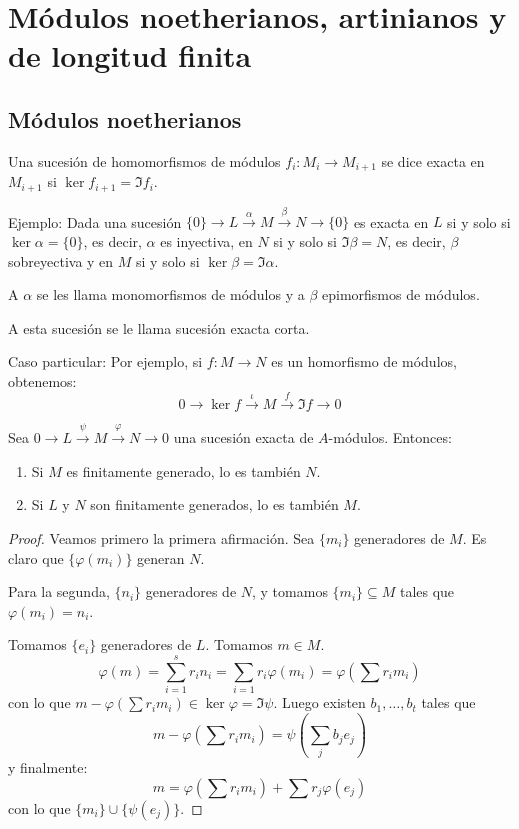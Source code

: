 \section{Módulos noetherianos, artinianos y de longitud finita}
\subsection{Módulos noetherianos}

\begin{df}
  Una sucesión de homomorfismos de módulos \(f_i:M_i\longrightarrow
  M_{i+1}\) se dice exacta en
  \(M_{i+1}\) si \(\ker f_{i+1}=\Im f_i\).
\end{df}

Ejemplo: Dada una sucesión \(\{0\}\longrightarrow L 
\overset{\alpha}{\longrightarrow} M 
\overset{\beta}{\longrightarrow} N\longrightarrow \{0\}\)
es exacta en \(L\) si y solo si \(\ker \alpha=\{0\}\), es decir,
\(\alpha\) es inyectiva, en \(N\) si y solo si \(\Im \beta = N\),
es decir, \(\beta\) sobreyectiva y en \(M\) si y solo si
\(\ker\beta=\Im\alpha\).

A \(\alpha\) se les llama monomorfismos de módulos y a
\(\beta\) epimorfismos de módulos.

A esta sucesión se le llama sucesión exacta corta.

Caso particular: Por ejemplo, si \(f:M\longrightarrow N\) es
un homorfismo de módulos, obtenemos:
\[
  0\longrightarrow\ker f\overset{\iota}{\longrightarrow}
  M \overset{f}{\longrightarrow}\Im f
  \longrightarrow 0
\]

\begin{prop}
  Sea \(0\longrightarrow L\overset{\psi}{\longrightarrow} M
  \overset{\varphi}{\longrightarrow}
  N\longrightarrow 0\) una sucesión exacta de \(A\)-módulos. Entonces:
  \begin{enumerate}
    \item Si \(M\) es finitamente generado, lo es también \(N\).
    \item Si \(L\) y \(N\) son finitamente generados, lo es también \(M\).
  \end{enumerate}
\end{prop}

\begin{proof}
  Veamos primero la primera afirmación. Sea \(\{m_i\}\) generadores de \(M\).
  Es claro que \(\{\varphi(m_i)\}\) generan \(N\).

  Para la segunda, \(\{n_i\}\) generadores de \(N\), y tomamos
  \(\{m_i\}\subseteq M\) tales que \(\varphi(m_i)= n_i\).

  Tomamos \(\{e_i\}\) generadores de \(L\). Tomamos \(m\in M\).
  \[
    \varphi(m)=\sum_{i=1}^s r_i n_i = \sum_{i=1} r_i\varphi(m_i)
    =\varphi\left(\sum r_i m_i\right)
  \]
  con lo que \(m-\varphi(\sum r_i m_i)\in\ker\varphi=\Im\psi\).
  Luego existen \(b_1,\ldots, b_t\) tales que
  \[
    m-\varphi\left(\sum r_i m_i\right)=
    \psi\left(\sum_j b_j e_j\right)
  \]
  y finalmente:
  \[
    m=\varphi\left(\sum r_i m_i\right)+\sum r_j \varphi(e_j)
  \]
  con lo que \(\{m_i\}\cup\{\psi(e_j)\}\).
\end{proof}

